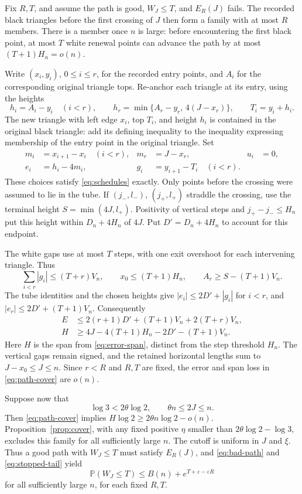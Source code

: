 \documentclass[11pt,a4paper]{article}
\newcommand{\PP}{\mathbb P}
\newcommand{\eps}{\varepsilon}
\newcommand{\abs}[1]{\left|#1\right|}
\begin{document}
Fix \(R,T\), and assume the path is good, \(W_J\le T\), and
\(E_R(J)\) fails. The recorded black triangles before the first
crossing of \(J\) then form a family with at most \(R\) members.
There is a member once \(n\) is large: before encountering the first
black point, at most \(T\) white renewal points can advance the path
by at most \((T+1)H_n=o(n)\).

Write \((x_i,y_i)\), \(0\le i\le r\), for the recorded entry points,
and \(A_i\) for the corresponding original triangle tops. Re-anchor
each triangle at its entry, using the heights
\[
 h_i=A_i-y_i\quad(i<r),\qquad
 h_r=\min\{A_r-y_r,\,4(J-x_r)\},\qquad T_i=y_i+h_i.
\]
The new triangle with left edge \(x_i\), top \(T_i\), and height
\(h_i\) is contained in the original black triangle: add its defining
inequality to the inequality expressing membership of the entry
point in the original triangle. Set
\begin{align*}
 m_i&=x_{i+1}-x_i\quad(i<r),& m_r&=J-x_r,&u_i&=0,\\
 e_i&=h_i-4m_i,&g_i&=y_{i+1}-T_i\quad(i<r).
\end{align*}
These choices satisfy \eqref{eq:schedules} exactly.
Only points before the crossing were assumed to lie in the tube.
If \((j_-,l_-)\), \((j_+,l_+)\) straddle the crossing, use the
terminal height \(S=\min(4J,l_+)\). Positivity of vertical steps and
\(j_+-j_-\le H_n\) put this height within \(D_n+4H_n\) of \(4J\).
Put \(D'=D_n+4H_n\) to account for this endpoint.

The white gaps use at most \(T\) steps, with one exit overshoot for
each intervening triangle. Thus
\[
 \sum_{i<r}\abs{g_i}\le(T+r)V_n,\qquad
 x_0\le(T+1)H_n,\qquad A_r\ge S-(T+1)V_n.
\]
The tube identities and the chosen heights give
\(\abs{e_i}\le2D'+\abs{g_i}\) for \(i<r\), and
\(\abs{e_r}\le2D'+(T+1)V_n\). Consequently
\begin{align}\label{eq:path-cover}
 E&\le2(r+1)D'+(T+1)V_n+2(T+r)V_n,\\
 H&\ge4J-4(T+1)H_n-2D'-(T+1)V_n.\nonumber
\end{align}
Here \(H\) is the span from \eqref{eq:error-span}, distinct from
the step threshold \(H_n\). The vertical gaps remain signed, and
the retained horizontal lengths sum to \(J-x_0\le J\le n\).
Since \(r<R\) and \(R,T\) are fixed, the error and span loss in
\eqref{eq:path-cover} are \(o(n)\).

Suppose now that
\begin{equation}\label{eq:entropy}
 \log3<2\theta\log2,\qquad \theta n\le2J\le n.
\end{equation}
Then \eqref{eq:path-cover} implies
\(H\log2\ge2\theta n\log2-o(n)\).
Proposition~\ref{prop:cover}, with any fixed positive \(\eta\) smaller
than \(2\theta\log2-\log3\), excludes this family for all sufficiently
large \(n\). The cutoff is uniform in \(J\) and \(\xi\).
Thus a good path with \(W_J\le T\) must satisfy \(E_R(J)\), and
\eqref{eq:bad-path} and \eqref{eq:stopped-tail} yield
\begin{equation}\label{eq:few-white}
 \PP(W_J\le T)\le B(n)+e^{T+\eps-\eps R}
\end{equation}
for all sufficiently large \(n\), for each fixed \(R,T\).
\end{document}
